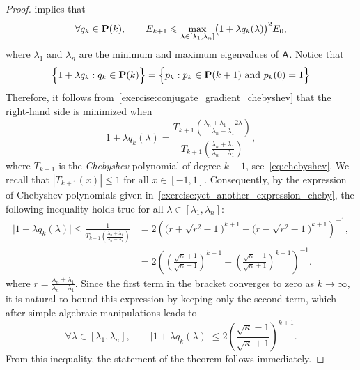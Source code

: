 \begin{proof}
 implies that
\begin{equation*}
    \forall q_k \in \mathbf P(k), \qquad
    E_{k+1} \leqslant  \max_{\lambda \in [\lambda_1, \lambda_n]}\bigl(1 + \lambda q_k(\lambda) \bigr)^2   E_0,
\end{equation*}
where $\lambda_1$ and $\lambda_n$ are the minimum and maximum eigenvalues of $\mathsf A$.
Notice that
\[
    \Bigl\{ 1 + \lambda q_k: q_k \in \mathbf P(k) \Bigr\} 
    = \Bigl\{p_k : p_k \in \mathbf P(k+1) \text{ and } p_k(0) = 1 \Bigr\}
\]
Therefore, it follows from~\cref{exercise:conjugate_gradient_chebyshev} that the right-hand side is minimized when
\begin{equation}
    \label{eq:conjugate_gradient_optimal_polynom}
    1 + \lambda q_k(\lambda) = \frac{T_{k+1}\left(\frac{\lambda_n + \lambda_1 - 2\lambda}{\lambda_n - \lambda_1}\right)}{T_{k+1}\left(\frac{\lambda_n + \lambda_1}{\lambda_n - \lambda_1}\right)},
\end{equation}
where $T_{k+1}$ is the \emph{Chebyshev} polynomial of degree $k+1$,
see~\eqref{eq:chebyshev}.
We recall that $|T_{k+1}(x)| \leq 1$ for all $x \in [-1, 1]$.
Consequently, by the expression of Chebyshev polynomials given in~\cref{exercise:yet_another_expression_cheby},
the following inequality holds true for all $\lambda \in [\lambda_1, \lambda_n]$:
\begin{align*}
    \bigl\lvert 1 + \lambda q_k(\lambda) \bigr\rvert
    \leq \frac{1}{T_{k+1}\left(\frac{\lambda_n + \lambda_1}{\lambda_n - \lambda_1}\right)}
    &= 2\left( \Big(r+\sqrt{r^2-1} \Big)^{k+1} + \Big(r-\sqrt{r^2-1}\Big)^{k+1} \right)^{-1},  \\
    &= 2 \left( \left( \frac{\sqrt{\kappa} + 1}{\sqrt{\kappa} - 1} \right)^{k+1} + \left( \frac{\sqrt{\kappa} - 1}{\sqrt{\kappa} + 1} \right)^{k+1} \right)^{-1}.
\end{align*}
where $r = \frac{\lambda_n + \lambda_1}{\lambda_n - \lambda_1}$.
Since the first term in the bracket converges to zero as $k \to \infty$,
it is natural to bound this expression by keeping only the second term,
which after simple algebraic manipulations leads to
\[
    \forall \lambda \in [\lambda_1, \lambda_n], \qquad
    \bigl\lvert 1 + \lambda q_k(\lambda) \bigr\rvert
    \leq 2 \left( \frac{\sqrt{\kappa} - 1}{\sqrt{\kappa} + 1} \right)^{k+1}.
\]
From this inequality,
the statement of the theorem follows immediately.
\end{proof}
